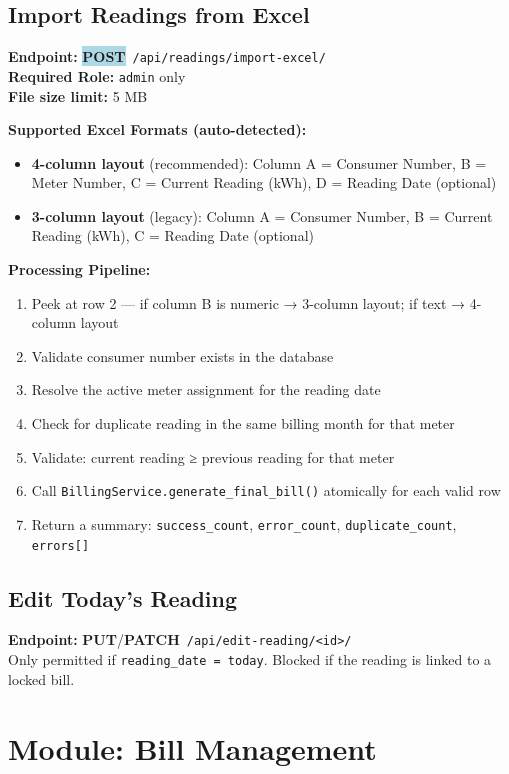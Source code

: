 \documentclass[12pt, a4paper]{report}
\newcommand{\httppost}{\colorbox{lightBlue}{\textcolor{deepBlue}{\textbf{\small POST}}}}
\newcommand{\httppatch}{\colorbox{warningBg}{\textcolor{accentAmber}{\textbf{\small PATCH}}}}
\newcommand{\httpput}{\colorbox{purple!10}{\textcolor{purple!70!black}{\textbf{\small PUT}}}}
\begin{document}
\subsection{Import Readings from Excel}
\textbf{Endpoint:} \httppost\ \texttt{/api/readings/import-excel/}\\
\textbf{Required Role:} \texttt{admin} only\\
\textbf{File size limit:} 5 MB

\textbf{Supported Excel Formats (auto-detected):}
\begin{itemize}[leftmargin=2em]
    \item \textbf{4-column layout} (recommended): Column A = Consumer Number, B = Meter Number, C = Current Reading (kWh), D = Reading Date (optional)
    \item \textbf{3-column layout} (legacy): Column A = Consumer Number, B = Current Reading (kWh), C = Reading Date (optional)
\end{itemize}

\textbf{Processing Pipeline:}
\begin{enumerate}[leftmargin=1.8em]
    \item Peek at row 2 — if column B is numeric → 3-column layout; if text → 4-column layout
    \item Validate consumer number exists in the database
    \item Resolve the active meter assignment for the reading date
    \item Check for duplicate reading in the same billing month for that meter
    \item Validate: current reading ≥ previous reading for that meter
    \item Call \texttt{BillingService.generate\_final\_bill()} atomically for each valid row
    \item Return a summary: \texttt{success\_count}, \texttt{error\_count}, \texttt{duplicate\_count}, \texttt{errors[]}
\end{enumerate}

\subsection{Edit Today's Reading}
\textbf{Endpoint:} \httpput/\httppatch\ \texttt{/api/edit-reading/<id>/}\\
Only permitted if \texttt{reading\_date = today}. Blocked if the reading is linked to a locked bill.

\section{Module: Bill Management}
\end{document}
